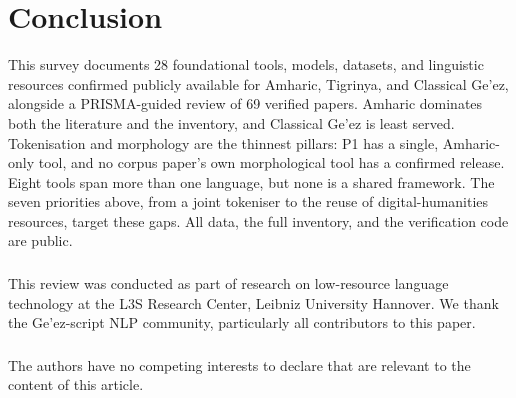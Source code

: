 \documentclass[runningheads]{llncs}
\begin{document}
\section{Conclusion}\label{sec:conclusion}

This survey documents 28 foundational tools, models, datasets, and linguistic resources confirmed publicly available for Amharic, Tigrinya, and Classical Ge'ez, alongside a PRISMA-guided review of 69 verified papers. Amharic dominates both the literature and the inventory, and Classical Ge'ez is least served. Tokenisation and morphology are the thinnest pillars: P1 has a single, Amharic-only tool, and no corpus paper's own morphological tool has a confirmed release. Eight tools span more than one language, but none is a shared framework. The seven priorities above, from a joint tokeniser to the reuse of digital-humanities resources, target these gaps. All data, the full inventory, and the verification code are public.

\begin{credits}
\subsubsection{\ackname} This review was conducted as part of research on low-resource language technology at the L3S Research Center, Leibniz University Hannover. We thank the Ge'ez-script NLP community, particularly all contributors to this paper.

\subsubsection{\discintname}
The authors have no competing interests to declare that are relevant to the content of this article.
\end{credits}



\end{document}
